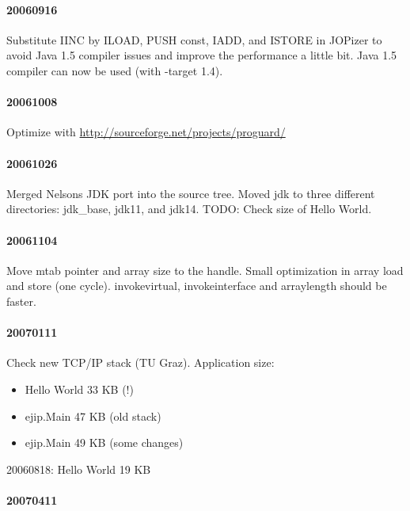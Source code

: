 \documentclass[a4paper,12pt]{scrartcl}
\newcommand{\code}[1]{{\textsf{#1}}}
\begin{document}
\paragraph{20060916}

Substitute IINC by ILOAD, PUSH const, IADD, and ISTORE in JOPizer to
avoid Java 1.5 compiler issues and improve the performance a little
bit. Java 1.5 compiler can now be used (with -target 1.4).

\paragraph{20061008}

Optimize with \url{http://sourceforge.net/projects/proguard/}

\paragraph{20061026}

Merged Nelsons JDK port into the source tree. Moved \code{jdk} to
three different directories: \code{jdk\_base}, \code{jdk11}, and
\code{jdk14}. TODO: Check size of Hello World.

\paragraph{20061104}

Move mtab pointer and array size to the handle. Small optimization in
array load and store (one cycle). invokevirtual, invokeinterface and
arraylength should be faster.

\paragraph{20070111}

Check new TCP/IP stack (TU Graz). Application size:
\begin{itemize}
    \item Hello World 33 KB (!)
    \item ejip.Main 47 KB (old stack)
    \item ejip.Main 49 KB (some changes)
\end{itemize}

20060818: Hello World 19 KB

%
%

\paragraph{20070411}
\end{document}
